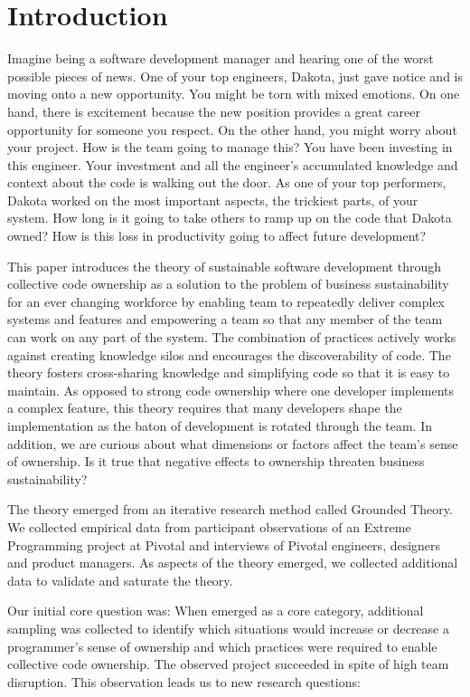 
\section{Introduction}

Imagine being a software development manager and hearing one of the worst possible pieces of news.  One of your top engineers, Dakota, just gave notice and is moving onto a new opportunity. You might be torn with mixed emotions. On one hand, there is excitement because the new position provides a great career opportunity for someone you respect. On the other hand, you might worry about your project. How is the team going to manage this? You have been investing in this engineer. Your investment and all the engineer's accumulated knowledge and context about the code is walking out the door.  As one of your top performers, Dakota worked on the most important aspects, the trickiest parts, of your system. How long is it going to take others to ramp up on the code that Dakota owned? How is this loss in productivity going to affect future development? 

This paper introduces the theory of sustainable software development through collective code ownership as a solution to the problem of business sustainability for an ever changing workforce by enabling team to repeatedly deliver complex systems and features and empowering a team so that any member of the team can work on any part of the system. The combination of practices actively works against creating knowledge silos and encourages the discoverability of code. The theory fosters cross-sharing knowledge and simplifying code so that it is easy to maintain. As opposed to strong code ownership where one developer implements a complex feature, this theory requires that many developers shape the implementation as the baton of development is rotated through the team. In addition, we are curious about what dimensions or factors affect the team's sense of ownership. Is it true that negative effects to ownership threaten business sustainability?

The theory emerged from an iterative research method called Grounded Theory. We collected empirical data from participant observations of an Extreme Programming project at Pivotal and interviews of Pivotal engineers, designers and product managers. As aspects of the theory emerged, we collected additional data to validate and saturate the theory.

Our initial core question was:  When  emerged as a core category, additional sampling was collected to identify which situations would increase or decrease a programmer's sense of ownership and which practices were required to enable collective code ownership. The observed project succeeded in spite of high team disruption. This observation leads us to new research questions: 

